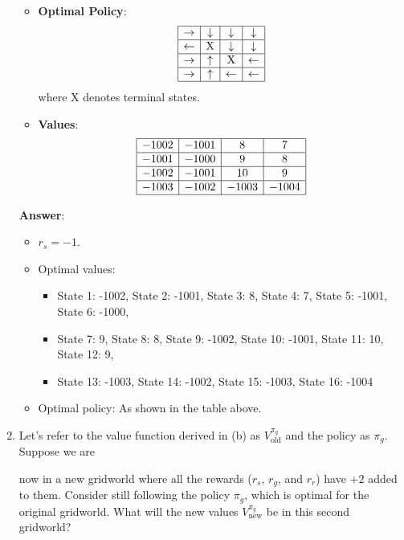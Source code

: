 \documentclass[a3paper,12pt]{extarticle} %
\begin{document}
\begin{enumerate}
\begin{itemize}
\begin{itemize}
    \end{itemize}
    \item \textbf{Optimal Policy}:
    \[
    \begin{array}{|c|c|c|c|}
    \hline
    \rightarrow & \downarrow & \downarrow & \downarrow \\
    \hline
    \leftarrow & \text{X} & \downarrow & \downarrow \\
    \hline
    \rightarrow & \uparrow & \text{X} & \leftarrow \\
    \hline
    \rightarrow & \uparrow & \leftarrow & \leftarrow \\
    \hline
    \end{array}
    \]
    where X denotes terminal states.
    \item \textbf{Values}:
    \[
    \begin{array}{|c|c|c|c|}
    \hline
    -1002 & -1001 & 8 & 7 \\
    \hline
    -1001 & -1000 & 9 & 8 \\
    \hline
    -1002 & -1001 & 10 & 9 \\
    \hline
    -1003 & -1002 & -1003 & -1004 \\
    \hline
    \end{array}
    \]
\end{itemize}

\textbf{Answer}:
\begin{itemize}
    \item \( r_s = -1 \).
    \item Optimal values:
    \begin{itemize}
        \item State 1: -1002, State 2: -1001, State 3: 8, State 4: 7, State 5: -1001, State 6: -1000,
        \item State 7: 9, State 8: 8, State 9: -1002, State 10: -1001, State 11: 10, State 12: 9,
        \item State 13: -1003, State 14: -1002, State 15: -1003, State 16: -1004
    \end{itemize}
    \item Optimal policy: As shown in the table above.
\end{itemize}
    \item Let’s refer to the value function derived in (b) as $V^{\pi_g}_{\text{old}}$ and the policy as $\pi_g$. Suppose we are

    now in a new gridworld where all the rewards ($r_s$, $r_g$, and $r_r$) have $+2$ added to them. Consider still
    following the policy $\pi_g$, which is optimal for the original gridworld. What will the new values $V^{\pi_g}_{\text{new}}$ be
    in this second gridworld?


\end{enumerate}
\end{document}
